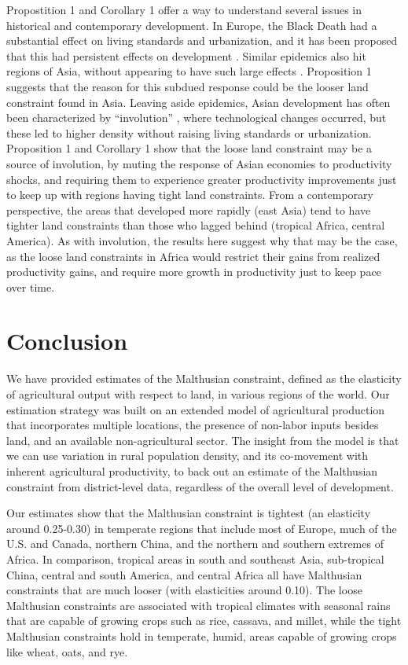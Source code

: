 \documentclass[11pt]{article}
\begin{document}
Propostition 1 and Corollary 1 offer a way to understand several issues in historical and contemporary development. In Europe, the Black Death had a substantial effect on living standards and urbanization, and it has been proposed that this had persistent effects on development \citep{vv08,vv13}. Similar epidemics also hit regions of Asia, without appearing to have such large effects \citep{McNeill1976}. Proposition 1 suggests that the reason for this subdued response could be the looser land constraint found in Asia. Leaving aside epidemics, Asian development has often been characterized by ``involution'' \citep{Geertz1963,Huang1990,huang2002}, where technological changes occurred, but these led to higher density without raising living standards or urbanization. Proposition 1 and Corollary 1 show that the loose land constraint may be a source of involution, by muting the response of Asian economies to productivity shocks, and requiring them to experience greater productivity improvements just to keep up with regions having tight land constraints. From a contemporary perspective, the areas that developed more rapidly (east Asia) tend to have tighter land constraints than those who lagged behind (tropical Africa, central America). As with involution, the results here suggest why that may be the case, as the loose land constraints in Africa would restrict their gains from realized productivity gains, and require more growth in productivity just to keep pace over time. 

\section{Conclusion}
We have provided estimates of the Malthusian constraint, defined as the elasticity of agricultural output with respect to land, in various regions of the world. Our estimation strategy was built on an extended model of agricultural production that incorporates multiple locations, the presence of non-labor inputs besides land, and an available non-agricultural sector. The insight from the model is that we can use variation in rural population density, and its co-movement with inherent agricultural productivity, to back out an estimate of the Malthusian constraint from district-level data, regardless of the overall level of development.

Our estimates show that the Malthusian constraint is tightest (an elasticity around 0.25-0.30) in temperate regions that include most of Europe, much of the U.S. and Canada, northern China, and the northern and southern extremes of Africa. In comparison, tropical areas in south and southeast Asia, sub-tropical China, central and south America, and central Africa all have Malthusian constraints that are much looser (with elasticities around 0.10). The loose Malthusian constraints are associated with tropical climates with seasonal rains that are capable of growing crops such as rice, cassava, and millet, while the tight Malthusian constraints hold in temperate, humid, areas capable of growing crops like wheat, oats, and rye.
\end{document}
